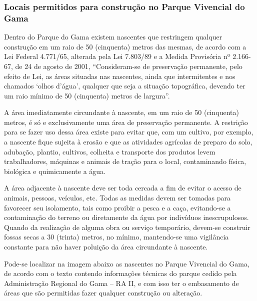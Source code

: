 \subsubsection{Locais permitidos para construção no Parque Vivencial do Gama}

	Dentro do Parque do Gama existem nascentes que restringem qualquer construção em um raio de 50 (cinquenta) metros das mesmas, de acordo com a Lei Federal 4.771/65, alterada pela Lei 7.803/89 e a Medida Provisória nº 2.166-67, de 24 de agosto de 2001, “Consideram-se de preservação permanente, pelo efeito de Lei, as áreas situadas nas nascentes, ainda que intermitentes e nos chamados ‘olhos d’água’, qualquer que seja a situação topográfica, devendo ter um raio mínimo de 50 (cinquenta) metros de largura”. 

	A área imediatamente circundante à nascente, em um raio de 50 (cinquenta) metros, é só e exclusivamente uma área de preservação permanente. A restrição para se fazer uso dessa área existe para evitar que, com um cultivo, por exemplo, a nascente fique sujeita à erosão e que as atividades agrícolas de preparo do solo, adubação, plantio, cultivos, colheita e transporte dos produtos levem trabalhadores, máquinas e animais de tração para o local, contaminando física, biológica e quimicamente a água.

	A área adjacente à nascente deve ser toda cercada a fim de evitar o acesso de animais, pessoas, veículos, etc. Todas as medidas devem ser tomadas para favorecer seu isolamento, tais como proibir a pesca e a caça, evitando-se a contaminação do terreno ou diretamente da água por indivíduos inescrupulosos. Quando da realização de alguma obra ou serviço temporário, devem-se construir fossas secas a 30 (trinta) metros, no mínimo, mantendo-se uma vigilância constante para não haver poluição da área circundante à nascente.

	Pode-se localizar na imagem abaixo as nascentes no Parque Vivencial do Gama, de acordo com o texto contendo informações técnicas do parque cedido pela Administração Regional do Gama – RA II, e com isso ter o embasamento de áreas que são permitidas fazer qualquer construção ou alteração.
	
